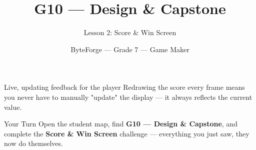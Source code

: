 \documentclass[aspectratio=169]{beamer}
\title{G10 — Design \& Capstone}
\subtitle{Lesson 2: Score \& Win Screen}
\author{ByteForge --- Grade 7 --- Game Maker}
\date{}
\begin{document}
\begin{frame}
    \titlepage
\end{frame}

\begin{frame}{Live, updating feedback for the player}
    \Large
    Redrawing the score every frame means you never have to manually "update" the display — it always reflects the current value.
\end{frame}

\begin{frame}{Your Turn}
    \Large
    Open the student map, find \textbf{G10 — Design \& Capstone}, and complete
    the \textbf{Score \& Win Screen} challenge --- everything you just saw, they now do themselves.
\end{frame}
\end{document}

